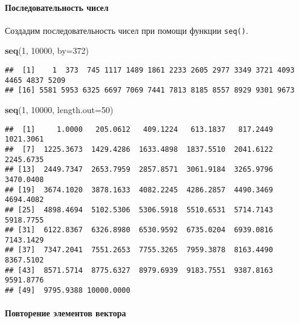 \documentclass[
]{article}
\newenvironment{Shaded}{\begin{snugshade}}{\end{snugshade}}
\newcommand{\AttributeTok}[1]{\textcolor[rgb]{0.13,0.29,0.53}{#1}}
\newcommand{\DecValTok}[1]{\textcolor[rgb]{0.00,0.00,0.81}{#1}}
\newcommand{\FunctionTok}[1]{\textcolor[rgb]{0.13,0.29,0.53}{\textbf{#1}}}
\newcommand{\NormalTok}[1]{#1}
\begin{document}
\paragraph{Последовательность
чисел}\label{ux43fux43eux441ux43bux435ux434ux43eux432ux430ux442ux435ux43bux44cux43dux43eux441ux442ux44c-ux447ux438ux441ux435ux43b}

Создадим последовательность чисел при помощи функции \texttt{seq()}.

\begin{Shaded}
\begin{Highlighting}[]
\FunctionTok{seq}\NormalTok{(}\DecValTok{1}\NormalTok{, }\DecValTok{10000}\NormalTok{, }\AttributeTok{by=}\DecValTok{372}\NormalTok{)}
\end{Highlighting}
\end{Shaded}

\begin{verbatim}
##  [1]    1  373  745 1117 1489 1861 2233 2605 2977 3349 3721 4093 4465 4837 5209
## [16] 5581 5953 6325 6697 7069 7441 7813 8185 8557 8929 9301 9673
\end{verbatim}

\begin{Shaded}
\begin{Highlighting}[]
\FunctionTok{seq}\NormalTok{(}\DecValTok{1}\NormalTok{, }\DecValTok{10000}\NormalTok{, }\AttributeTok{length.out=}\DecValTok{50}\NormalTok{)}
\end{Highlighting}
\end{Shaded}

\begin{verbatim}
##  [1]     1.0000   205.0612   409.1224   613.1837   817.2449  1021.3061
##  [7]  1225.3673  1429.4286  1633.4898  1837.5510  2041.6122  2245.6735
## [13]  2449.7347  2653.7959  2857.8571  3061.9184  3265.9796  3470.0408
## [19]  3674.1020  3878.1633  4082.2245  4286.2857  4490.3469  4694.4082
## [25]  4898.4694  5102.5306  5306.5918  5510.6531  5714.7143  5918.7755
## [31]  6122.8367  6326.8980  6530.9592  6735.0204  6939.0816  7143.1429
## [37]  7347.2041  7551.2653  7755.3265  7959.3878  8163.4490  8367.5102
## [43]  8571.5714  8775.6327  8979.6939  9183.7551  9387.8163  9591.8776
## [49]  9795.9388 10000.0000
\end{verbatim}

\paragraph{Повторение элементов
вектора}\label{ux43fux43eux432ux442ux43eux440ux435ux43dux438ux435-ux44dux43bux435ux43cux435ux43dux442ux43eux432-ux432ux435ux43aux442ux43eux440ux430}
\end{document}
